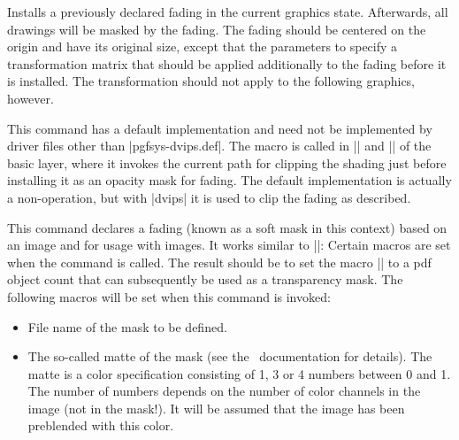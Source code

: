 \begin{command}{\pgfsys@usefading{}}
    Installs a previously declared fading  in the current graphics
    state. Afterwards, all drawings will be masked by the fading. The fading
    should be centered on the origin and have its original size, except that
    the parameters  to  specify a transformation matrix that
    should be applied additionally to the fading before it is installed. The
    transformation should not apply to the following graphics, however.
\end{command}

\begin{command}{\pgfsys@clipfading}
    This command has a default implementation and need not be implemented by
    driver files other than |pgfsys-dvips.def|. The macro is called
    in |\pgfsetfadingforcurrentpath| and |\pgfsetfadingforcurrentpathstroked|
    of the basic layer, where it invokes the current path for clipping the
    shading just before installing it as an opacity mask for fading. The
    default implementation is actually a non-operation, but with |dvips| it
    is used to clip the fading as described.
\end{command}

\begin{command}{\pgfsys@definemask}
    This command declares a fading (known as a soft mask in this context) based
    on an image and for usage with images. It works similar to
    |\pgfsys@defineimage|: Certain macros are set when the command is called.
    The result should be to set the macro |\pgf@mask| to a pdf object count
    that can subsequently be used as a transparency mask. The following macros
    will be set when this command is invoked:
    \begin{itemize}
        \item {}
            File name of the mask to be defined.
        \item {}
            The so-called matte of the mask (see the \pdf\ documentation for
            details). The matte is a color specification consisting of 1, 3 or
            4 numbers between 0 and 1. The number of numbers depends on the
            number of color channels in the image (not in the mask!). It will
            be assumed that the image has been preblended with this color.
    \end{itemize}
\end{command}


